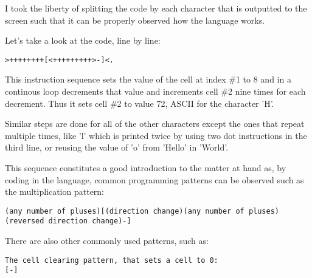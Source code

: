 \par I took the liberty of splitting the code by each character that is outputted to the screen such that it can be properly observed how the language works.

\par Let's take a look at the code, line by line:

\begin{verbatim}
>++++++++[<+++++++++>-]<.
\end{verbatim}

\par This instruction sequence sets the value of the cell at index \#1 to 8 and in a continous loop decrements that value and increments cell \#2 nine times for each decrement. Thus it sets cell \#2 to value 72, ASCII for the character 'H'.

\par Similar steps are done for all of the other characters except the ones that repeat multiple times, like 'l' which is printed twice by using two dot instructions in the third line, or reusing the value of 'o' from 'Hello' in 'World'.

\par This sequence constitutes a good introduction to the matter at hand as, by coding in the language, common programming patterns can be observed such as the multiplication pattern:

\begin{verbatim}
(any number of pluses)[(direction change)(any number of pluses)(reversed direction change)-]
\end{verbatim}

\par There are also other commonly used patterns, such as:

\begin{verbatim}
The cell clearing pattern, that sets a cell to 0:
[-]
\end{verbatim}

